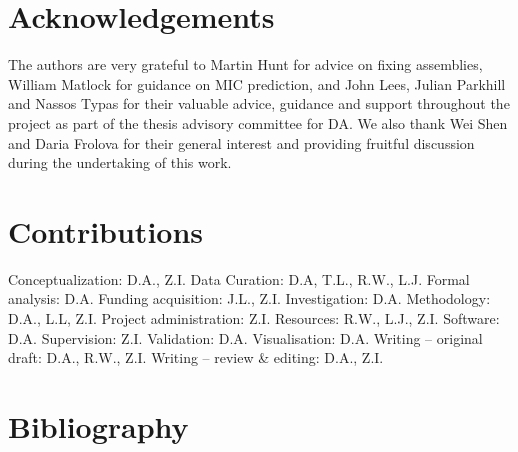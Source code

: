 \section*{Acknowledgements}
The authors are very grateful to Martin Hunt for advice on fixing assemblies, William Matlock for guidance on MIC prediction, and John Lees, Julian Parkhill and Nassos Typas for their valuable advice, guidance and support throughout the project as part of the thesis advisory committee for DA. We also thank Wei Shen and Daria Frolova for their general interest and providing fruitful discussion during the undertaking of this work.

\section*{Contributions}
Conceptualization: D.A., Z.I. Data Curation: D.A, T.L., R.W., L.J. Formal analysis: D.A. Funding acquisition: J.L., Z.I. Investigation: D.A. Methodology: D.A., L.L, Z.I. Project administration: Z.I. Resources: R.W., L.J., Z.I. Software: D.A. Supervision: Z.I. Validation: D.A. Visualisation: D.A. Writing – original draft: D.A., R.W., Z.I. Writing – review \& editing: D.A., Z.I.

\section*{Bibliography}

